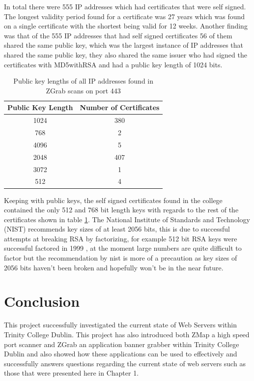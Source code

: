 \documentclass[a4wide,leqno,12pt]{report}
\begin{document}
In total there were 555 IP addresses which had certificates that were self signed. The longest validity period found for a certificate was 27 years which was found on a single certificate with the shortest being valid for 12 weeks. Another finding was that of the 555 IP addresses that had self signed certificates 56 of them shared the same public key, which was the largest instance of IP addresses that shared the same public key, they also shared the same issuer who had signed the certificates with MD5withRSA and had a public key length of 1024 bits.


\begin{table}[H]
\centering
\begin{tabular}{||c c  ||}
 \hline
Public Key Length  & Number of Certificates\\ [0.5ex]
 \hline\hline
1024 & 380\\
768	& 2\\
4096 &	5\\
2048 &407\\
3072 & 1\\
512	& 4\\[1ex]

 \hline
\end{tabular}
\caption{Public key lengths of all IP addresses found in ZGrab scans on port 443}
\label{table:public_key_lengths}
\end{table}
Keeping with public keys, the self signed certificates found in the college contained the only 512 and 768 bit length keys with regards to the rest of the certificates shown in table \ref{table:public_key_lengths}. The National Institute of Standards and Technology (NIST) recommends key sizes of at least 2056 bits, \cite{barker2015recommendation} this is due to successful attempts at breaking RSA by factorizing, for example 512 bit RSA keys were successful factored in 1999 \cite{kaliski2011rsa}, at the moment large numbers are quite difficult to factor but the recommendation by nist is more of a precaution as key sizes of 2056 bits haven't been broken and hopefully won't be in the near future.
\chapter{Conclusion}

This project successfully investigated the current state of Web Servers within Trinity College Dublin. 
This project has also introduced both ZMap a high speed port scanner and ZGrab an application banner grabber within Trinity College Dublin and also showed how these applications can be used to effectively and successfully answers questions regarding the current state of web servers such as those that were presented here in Chapter 1.\\
\end{document}
